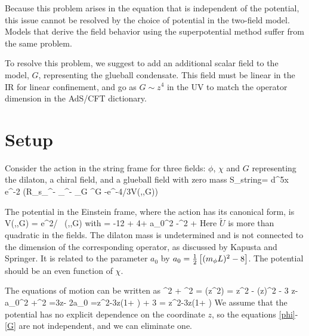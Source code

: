 Because this problem arises in the equation that is independent of the potential, this issue cannot be resolved by the choice of potential in the two-field model. 
Models that derive the field behavior using the superpotential method suffer from the same problem.

To resolve this problem, we suggest to add an additional scalar field to the model, $G$, representing the glueball condensate. 
This field must be linear in the IR for linear confinement, and go as $G \sim z^4$ in the UV to match the operator dimension in the AdS/CFT dictionary.

\section{Setup}
Consider the action in the string frame for three fields: $\phi$, $\chi$ and $G$ representing the dilaton, a chiral field, and a glueball field with zero mass
\be
S_{string}= \int d^5x \root e^{-2\Phi} \left(R_s\partial_\mu\Phi\partial^\mu\Phi - \thalf\partial_\mu\chi\partial^\mu\chi - \thalf\partial_\mu G \partial^\mu G -e^{-4\Phi/3}V(\phi,\chi,G)\right)
\ee

The potential in the Einstein frame, where the action has its canonical form, is
\be
V(\phi,\chi,G) = {\rm e}^{2\phi/} \, (\phi,\chi,G) \label{transform}
\ee
with
\be
{} = -12 + 4\phi + a_0\phi^2 -\tthalf\chi^2 + 
\label{V}
\ee
Here $\tilde{U}$ is more than quadratic in the fields.  
The dilaton mass is undetermined and is not connected to the dimension of the corresponding operator, as discussed by Kapusta and Springer.  
It is related to the parameter $a_0$ by $a_0 = \thalf \left[ \mL2-8 \right]$. 
The potential should be an even function of $\chi$. 

The equations of motion can be written as
\be
\chidot^2 + \Gdot^2 =  \Dz(z^2\phidot)
\label{C}
\ee
\be
{}=\thalf {} z^2 \phiddot - \tthalf (z\phidot)^2 - 3  z\phi - a_0\phi^2 +\tthalf\chi^2
\label{U}
\ee
\be
 =3z\phidot - 2a_0\phi
\label{phi}
\ee
\be
=z^2\chiddot -3z\chidot \left(1+ \right) + 3\chi
\label{chi}
\ee
\be
 =
z^2\Gddot -3z\Gdot \left(1+ \right)
\label{G}
\ee
We assume that the potential has no explicit dependence on the coordinate $z$,  so the equations \ref{phi}-\ref{G} are not independent, and we can eliminate one. 

